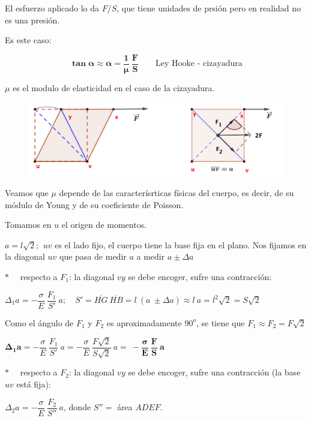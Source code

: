  El esfuerzo aplicado lo da $F/S$, que tiene unidades de prsión pero en realidad no es una presión.
 
 Es este caso:
 
 \begin{equation}
 \boldsymbol{\tan \alpha \approx \alpha = \dfrac 1 \mu \  \dfrac F S} \qquad \text{Ley Hooke - cizayadura}	
\end{equation}

$\mu$ es el modulo de elasticidad en el caso de la cizayadura.

\begin{figure}[H]
	\centering
	\includegraphics[width=1\textwidth]{imagenes/imagenes09/T09IM05.png}
\end{figure}

Veamos que $\mu$ depende de las caracterísrticas físicas del cuerpo, es decir, de su módulo de Young y de su coeficiente de Poisson.

Tomamos en $u$ el origen de momentos.

$a=l\sqrt 2$; $\ uv$ es el lado fijo, el cuerpo tiene la base fija en el plano. Nos fijamos en la diagonal $uv$ que pasa de medir $a$ a medir $a \pm \Delta a$

$\ast \quad$ respecto a $F_1$: la diagonal $vy$ se debe encoger, sufre una contracción:

$\Delta_1 a=-\dfrac \sigma E \ \dfrac {F_1}{S'} \ a; \quad S'=\overline{HG}\ \overline{HB}=l\ (a\ \pm \Delta a)\approx l\ a=l^2\sqrt 2=S \sqrt 2$ 

Como el ángulo de $F_1$ y $F_2$ es aproximadamente $90^o$, se tiene que $F_1\approx F_2=F\sqrt 2$

$\boldsymbol{\Delta_1 a}=-\dfrac \sigma E \ \dfrac {F_1} {S'} \ a = -\dfrac \sigma E \ \dfrac{F \sqrt 2}{S \sqrt 2} \ a =\boldsymbol{\ - \dfrac \sigma E \ \dfrac {F}{S} \ a}$

$\ast \quad$ respecto a $F_2$: la diagonal $vy$ se debe encoger, sufre una contracción (la base $uv$ está fija):

$\Delta_2 a=-\dfrac \sigma E\ \dfrac{F_2}{S''} \ a$, donde $S''=$ área $ADEF$.

